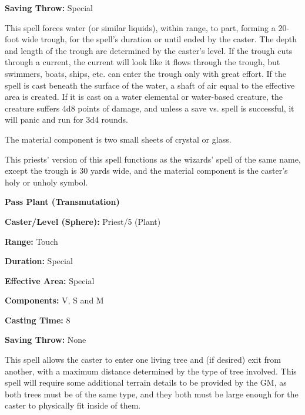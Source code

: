 \begin{multicols}{2}
\begin{minipage}{\columnwidth}
\noindent \textbf{Saving Throw:} Special

\end{minipage}

This spell forces water (or similar liquids), within range, to part, forming a 20-foot wide trough, for the spell's duration or until ended by the caster.  The depth and length of the trough are determined by the caster's level.  If the trough cuts through a current, the current will look like it flows through the trough, but swimmers, boats, ships, etc. can enter the trough only with great effort.  If the spell is cast beneath the surface of the water, a shaft of air equal to the effective area is created.  If it is cast on a water elemental or water-based creature, the creature suffers 4d8 points of damage, and unless a save vs. spell is successful, it will panic and run for 3d4 rounds.

The material component is two small sheets of crystal or glass.

This priests' version of this spell functions as the wizards' spell of the same name, except the trough is 30 yards wide, and the material component is the caster's holy or unholy symbol.

\vspace{1em}

\noindent
\begin{minipage}{\columnwidth}

\noindent \textbf{Pass Plant (Transmutation)}

\noindent \textbf{Caster/Level (Sphere):} Priest/5 (Plant)

\noindent \textbf{Range:} Touch

\noindent \textbf{Duration:} Special

\noindent \textbf{Effective Area:} Special

\noindent \textbf{Components:} V, S and M

\noindent \textbf{Casting Time:} 8

\noindent \textbf{Saving Throw:} None

\end{minipage}

This spell allows the caster to enter one living tree and (if desired) exit from another, with a maximum distance determined by the type of tree involved.  This spell will require some additional terrain details to be provided by the GM, as both trees must be of the same type, and they both must be large enough for the caster to physically fit inside of them.


\end{multicols}
